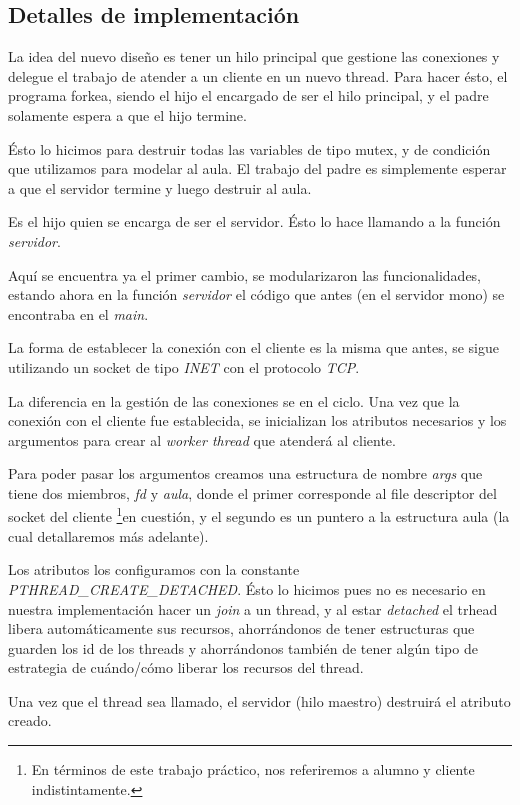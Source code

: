\documentclass[a4paper]{article}
\begin{document}
\subsection{Detalles de implementación}
La idea del nuevo diseño es tener un hilo principal que gestione las
conexiones y delegue el trabajo de atender a un cliente en un nuevo thread.
Para hacer ésto, el programa forkea, siendo el hijo el encargado de ser el
hilo principal, y el padre solamente espera a que el hijo termine.

Ésto lo hicimos para destruir todas las variables de tipo mutex, y de
condición que utilizamos para modelar al aula. El trabajo del padre es
simplemente esperar a que el servidor termine y luego destruir al aula.

Es el hijo quien se encarga de ser el servidor. Ésto lo hace llamando a la
función \textit{servidor}.

Aquí se encuentra ya el primer cambio, se modularizaron las funcionalidades,
estando ahora en la función \textit{servidor} el código que antes (en el
servidor mono) se encontraba en el \textit{main}.

La forma de establecer la conexión con el cliente es la misma que antes, se
sigue utilizando un socket de tipo \textit{INET} con el protocolo
\textit{TCP}.

La diferencia en la gestión de las conexiones se en el ciclo. Una vez que la
conexión con el cliente fue establecida, se inicializan los atributos
necesarios y los argumentos para crear al \textit{worker thread} que
atenderá al cliente.

Para poder pasar los argumentos creamos una estructura de nombre
\textit{args} que tiene dos miembros, \textit{fd} y \textit{aula}, donde el
primer corresponde al file descriptor del socket del cliente \footnote{En términos de este trabajo práctico, nos referiremos a alumno y cliente indistintamente.}en cuestión, y el segundo es un puntero a la estructura aula (la cual detallaremos más
adelante).

Los atributos los configuramos con la constante
\textit{PTHREAD\_CREATE\_DETACHED}. Ésto lo hicimos pues no es necesario en
nuestra implementación hacer un \textit{join} a un thread, y al estar
\textit{detached} el trhead libera automáticamente sus recursos,
ahorrándonos de tener estructuras que guarden los id de los threads y
ahorrándonos también de tener algún tipo de estrategia de cuándo/cómo
liberar los recursos del thread.

Una vez que el thread sea llamado, el servidor (hilo maestro) destruirá el
atributo creado.
\end{document}
